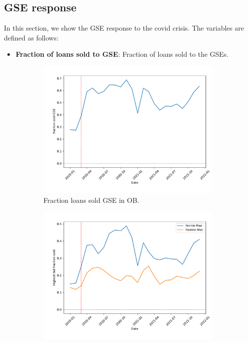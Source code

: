 \documentclass[11pt,a4paper]{article}
\begin{document}
\pagebreak
\subsection{GSE response }

 In this section, we show the GSE response to the covid crisis. The variables are defined as follows:
\begin{itemize}
\item \textbf{Fraction of loans sold to GSE}: Fraction of loans sold to the GSEs.
\end{itemize}

\begin{figure}[h]
  \centering
  \begin{subfigure}[b]{0.49\textwidth}
      \includegraphics[width=0.998\textwidth]{../results/figures/sold_GSE_mean_mat30_loan1_timeseries_nrmonthly_2.5_4_.pdf}
      \caption{Fraction loans sold GSE in OB. }
     \end{subfigure}
     \begin{subfigure}[b]{0.49\textwidth}
      \includegraphics[width=0.998\textwidth]{../results/figures/sold_FreddieBid_mean_mat30_loan1_timeseries_nrmonthly_2.5_4_.pdf}

\end{subfigure}
\end{figure}
\end{document}
